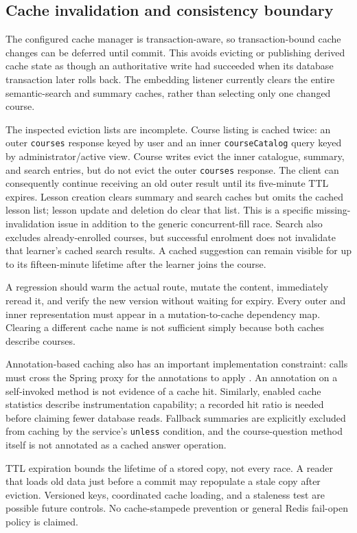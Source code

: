 \documentclass[12pt,a4paper,oneside]{report}
\begin{document}
\subsection{Cache invalidation and consistency boundary}
The configured cache manager is transaction-aware, so transaction-bound cache changes
can be deferred until commit. This avoids evicting or publishing derived cache state
as though an authoritative write had succeeded when its database transaction later
rolls back. The embedding listener currently clears the entire semantic-search and
summary caches, rather than selecting only one changed course.

The inspected eviction lists are incomplete. Course listing is cached twice: an
outer \texttt{courses} response keyed by user and an inner \texttt{courseCatalog}
query keyed by administrator/active view. Course writes evict the inner catalogue,
summary, and search entries, but do not evict the outer \texttt{courses} response.
The client can consequently continue receiving an old outer result until its
five-minute TTL expires. Lesson creation clears summary and search caches but omits
the cached lesson list; lesson update and deletion do clear that list. This is a
specific missing-invalidation issue in addition to the generic concurrent-fill race.
Search also excludes already-enrolled courses, but successful enrolment does not
invalidate that learner's cached search results. A cached suggestion can remain
visible for up to its fifteen-minute lifetime after the learner joins the course.

A regression should warm the actual route, mutate the content, immediately reread
it, and verify the new version without waiting for expiry. Every outer and inner
representation must appear in a mutation-to-cache dependency map. Clearing a
different cache name is not sufficient simply because both caches describe courses.

Annotation-based caching also has an important implementation constraint: calls must
cross the Spring proxy for the annotations to apply \cite{springcache}. An annotation
on a self-invoked method is not evidence of a cache hit. Similarly, enabled cache
statistics describe instrumentation capability; a recorded hit ratio is needed before
claiming fewer database reads. Fallback summaries are explicitly excluded from caching
by the service's \texttt{unless} condition, and the course-question method itself is
not annotated as a cached answer operation.

TTL expiration bounds the lifetime of a stored copy, not every race. A reader that
loads old data just before a commit may repopulate a stale copy after eviction.
Versioned keys, coordinated cache loading, and a staleness test are possible future
controls. No cache-stampede prevention or general Redis fail-open policy is claimed.
\end{document}
